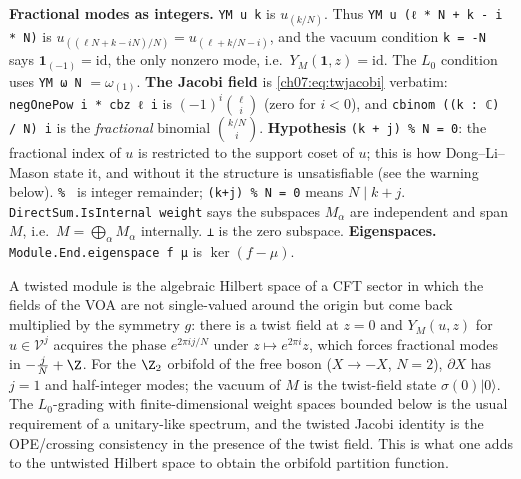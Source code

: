 \begin{dictionary}
\textbf{Fractional modes as integers.} \verb|YM u k| is $u_{(k/N)}$. Thus
\verb|YM u (ℓ * N + k - i * N)| is $u_{((\ell N+k-iN)/N)} = u_{(\ell + k/N - i)}$, and the
vacuum condition \verb|k = -N| says $\mathbf 1_{(-1)} = \mathrm{id}$, the only nonzero mode,
i.e.\ $Y_M(\mathbf 1,z) = \mathrm{id}$. The $L_0$ condition uses \verb|YM ω N| $=\omega_{(1)}$.
\textbf{The Jacobi field} is \eqref{ch07:eq:twjacobi} verbatim: \verb|negOnePow i * cbz ℓ i| is
$(-1)^i\binom{\ell}{i}$ (zero for $i<0$), and \verb|cbinom ((k : ℂ) / N) i| is the
\emph{fractional} binomial $\binom{k/N}{i}$. \textbf{Hypothesis} \verb|(k + j) % N = 0|: the
fractional index of $u$ is restricted to the support coset of $u$; this is how Dong--Li--Mason
state it, and without it the structure is unsatisfiable (see the warning below).
\verb|% | is integer remainder; \verb|(k+j) % N = 0| means $N\mid k+j$. \verb|DirectSum.IsInternal weight|
says the subspaces $M_\alpha$ are independent and span $M$, i.e.\ $M = \bigoplus_\alpha M_\alpha$
internally. \verb|⊥| is the zero subspace.
\textbf{Eigenspaces.} \verb|Module.End.eigenspace f μ| is $\ker(f-\mu)$.
\end{dictionary}

\begin{physics}
A twisted module is the algebraic Hilbert space of a CFT sector in which the fields of the VOA are not single-valued around the origin but come back multiplied by the symmetry $g$: there is a twist field at $z=0$ and $Y_M(u,z)$ for $u\in\mathcal V^j$ acquires the phase $e^{2\pi ij/N}$ under $z\mapsto e^{2\pi i}z$, which forces fractional modes in $-\tfrac jN+\Z$. For the $\Z_2$ orbifold of the free boson ($X\to-X$, $N=2$), $\partial X$ has $j=1$ and half-integer modes; the vacuum of $M$ is the twist-field state $\sigma(0)|0\rangle$. The $L_0$-grading with finite-dimensional weight spaces bounded below is the usual requirement of a unitary-like spectrum, and the twisted Jacobi identity is the OPE/crossing consistency in the presence of the twist field. This is what one adds to the untwisted Hilbert space to obtain the orbifold partition function.
\end{physics}

